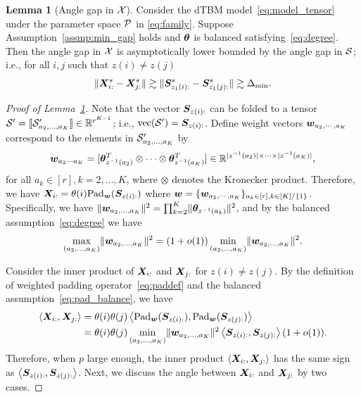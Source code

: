\documentclass[lettersize,onecolumn,journal]{IEEEtran}
\theoremstyle{definition}
\newtheorem{lem}{Lemma}
\theoremstyle{definition}
\newcommand{\ang}[1]{\left\langle#1\right\rangle}
\begin{document}
\begin{lem}[Angle gap in $\mathcal{X}$]\label{lem:angle_gap_x} Consider the dTBM model~\eqref{eq:model_tensor} under the parameter space $\mathcal{P}$ in \eqref{eq:family}. Suppose Assumption~\ref{assmp:min_gap} holds and $\boldsymbol{\theta}$ is balanced satisfying~\eqref{eq:degree}. Then the angle gap in $\mathcal{X}$ is asymptotically lower bounded by the angle gap in $\mathcal{S}$; i.e., for all $i,j$ such that $z(i) \neq z(j)$
\begin{equation}
    \lVert\bm X_{i:}^s - \bm X_{j:}^s\rVert \gtrsim  \lVert\bm S_{z_1(i):}^s - \bm S_{z_1(j):}^s\rVert \gtrsim  \Delta_{\min}.
\end{equation}

\end{lem}

\begin{proof}[Proof of Lemma~\ref{lem:angle_gap_x}] 
Note that the vector $\bm S_{z(i):}$ can be folded to a tensor $\mathcal{S}' =\llbracket \mathcal{S}'_{a_2,\ldots,a_K} \rrbracket \in \mathbb{R}^{r^{K-1}}$; i.e., $\text{vec}(\mathcal{S}') = \bm S_{z(i):}$. Define weight vectors $\bm{w}_{a_2, \cdots, a_K}$ correspond to the elements in $\mathcal{S}'_{a_2,\ldots,a_K}$ by
\begin{equation}
    \bm{w}_{a_2 \cdots a_K} = [ \boldsymbol{\theta}_{z^{-1} (a_2)}^T \otimes \cdots \otimes \boldsymbol{\theta}_{z^{-1} (a_K)}^T] \in \mathbb{R}^{|z^{-1} (a_2)| \times \cdots \times |z^{-1} (a_K)|},
\end{equation}
for all $a_k \in [r], k = 2,\ldots, K$, where $\otimes$ denotes the Kronecker product. Therefore, we have  $\bm X_{i:} = \theta(i) \text{Pad}_{\bm{w}}(\bm S_{z(i):})$ where $\bm{w} = \{ \bm{w}_{a_2, \cdots, a_K}\}_{a_k \in [r], k\in [K]/\{1\}}$. Specifically, we have $\lVert\bm{w}_{a_2, \ldots, a_K}\rVert^2 = \prod_{k = 2}^K \lVert \boldsymbol{\theta}_{z^{-1}(a_k)}\rVert^2$, and by the balanced assumption~\eqref{eq:degree} we have 
\begin{equation}\label{eq:pad_balance}
    \max_{(a_2,\ldots, a_K)} \onormSize{}{\mw_{a_2,\ldots, a_K}}^2 = (1 + o(1))  \min_{(a_2,\ldots, a_K)} \onormSize{}{\mw_{a_2,\ldots, a_K}}^2.
\end{equation}

Consider the inner product of $\bm X_{i:}$ and $\bm X_{j:}$ for $z(i) \neq z(j)$. By the definition of weighted padding operator~\eqref{eq:paddef} and the balanced assumption~\eqref{eq:pad_balance}, we have 
\begin{align}
    \ang{\mX_{i:},\mX_{j:}} &= \theta(i) \theta(j) \ang{ \pad_{\mw}(\mS_{z(i):}), \pad_{\mw}(\mS_{z(j):} )}\\
    &= \theta(i) \theta(j) \min_{(a_2,\ldots, a_K)} \onormSize{}{\mw_{a_2,\ldots, a_K}}^2 \ang{\mS_{z(i):}, \mS_{z(j):}}(1 + o(1)).
\end{align}
Therefore, when $p$ large enough, the inner product $\ang{\mX_{i:},\mX_{j:}} $ has the same sign as $\ang{\mS_{z(i):}, \mS_{z(j):}}$. Next, we discuss the angle between $\bm X_{i:}$ and $\bm X_{j:}$ by two cases.


\end{proof}
\end{document}
